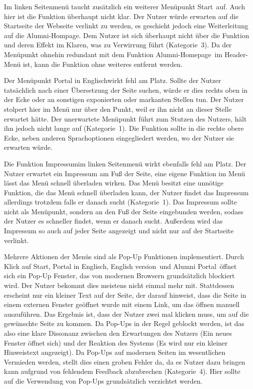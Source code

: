 {Im linken Seitenmenü taucht zusätzlich ein weiterer Menüpunkt \glqq Start\grqq~auf. Auch hier ist die Funktion überhaupt nicht klar. Der Nutzer würde erwarten auf die Startseite der Webseite verlinkt zu werden, es geschieht jedoch eine Weiterleitung auf die Alumni-Hompage. 
}
{Dem Nutzer ist sich überhaupt nicht über die Funktion und deren Effekt im Klaren, was zu Verwirrung führt (Kategorie~3).
}
{Da der Menüpunkt ohnehin redundant mit dem Funktion \glqq Alumni-Homepage\grqq~im Header-Menü ist, kann die Funktion ohne weiteres entfernt werden.
}

{Der Menüpunkt \glqq Portal in Englisch\grqq wirkt fehl am Platz. Sollte der Nutzer tatsächlich nach einer Übersetzung der Seite suchen, würde er dies rechts oben in der Ecke oder an sonstigen exponierten oder markanten Stellen tun. 
Der Nutzer stolpert hier im Menü nur über den Punkt, weil er ihn nicht an dieser Stelle erwartet hätte.
}
{Der unerwartete Menüpunkt führt zum Stutzen des Nutzers, hält ihn jedoch nicht lange auf (Kategorie~1).
}
{Die Funktion sollte in die rechte obere Ecke, neben anderen Sprachoptionen eingegliedert werden, wo der Nutzer sie erwarten würde.
}

{Die Funktion \glqq Impressum\grqq im linken Seitenmenü wirkt ebenfalls fehl am Platz. Der Nutzer erwartet ein Impressum am Fuß der Seite, eine eigene Funktion im Menü lässt das Menü schnell überladen wirken.
}
{Das Menü besitzt eine unnötige Funktion, die das Menü schnell überladen kann, der Nutzer findet das Impressum allerdings trotzdem falls er danach sucht (Kategorie~1).
}
{Das Impressum sollte nicht als Menüpunkt, sondern an den Fuß der Seite eingebunden werden, sodass der Nutzer es schneller findet, wenn er danach sucht. 
Außerdem wird das Impressum so auch auf jeder Seite angezeigt und nicht nur auf der Startseite verlinkt. 
}

{Mehrere Aktionen der Menüs sind als Pop-Up Funktionen implementiert. Durch Klick auf \glqq Start\grqq, \glqq Portal in Englisch\grqq, \glqq English version\grqq~und \glqq Alumni Portal\grqq~öffnet sich ein Pop-Up Fenster, das von modernen Browsern grundsätzlich blockiert wird. 
Der Nutzer bekommt dies meistens nicht einmal mehr mit. Stattdessen erscheint nur ein kleiner Text auf der Seite, der darauf hinweist, dass die Seite in einem externen Fenster geöffnet wurde mit einem Link, um das öffnen manuell auszuführen.
Das Ergebnis ist, dass der Nutzer zwei mal klicken muss, um auf die gewünschte Seite zu kommen.
}
{Da Pop-Ups in der Regel geblockt werden, ist das also eine klare Dissonanz zwischen den Erwartungen des Nutzers (Ein neues Fenster öffnet sich) und der Reaktion des Systems (Es wird nur ein kleiner Hinweistext angezeigt). Da Pop-Ups auf modernen Seiten im wesentlichen Vermieden werden, stellt dies einen groben Fehler da, da es Nutzer dazu bringen kann aufgrund von fehlendem Feedback abzubrechen (Kategorie~4).
}
{Hier sollte auf die Verwendung von Pop-Ups grundsätzlich verzichtet werden.
}

